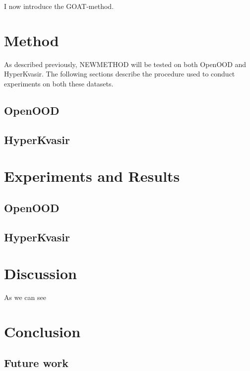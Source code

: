 \documentclass[UKenglish]{uiomasterthesis} %
\theoremstyle{definition}
\begin{document}
I now introduce the GOAT-method.

\chapter{Method} \label{chapter:method}

As described previously, NEWMETHOD will be tested on both OpenOOD and HyperKvasir. The following sections describe the procedure used to conduct experiments on both these datasets.

\section{OpenOOD}

\section{HyperKvasir}

\chapter{Experiments and Results} \label{chapter:experiments}

\section{OpenOOD}

\section{HyperKvasir}

\chapter{Discussion} \label{chapter:discussion}

As we can see

\chapter{Conclusion} \label{chapter:conclusion}

\section{Future work}



\backmatter{}
\printbibliography{}
\end{document}
